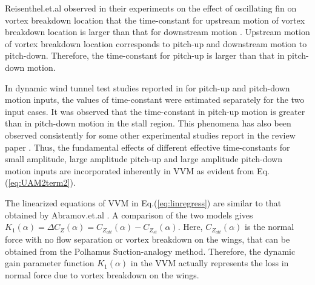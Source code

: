 \documentclass{AIAA}
\begin{document}
Reisenthel.et.al observed in their experiments on the effect of oscillating fin on vortex breakdown location that the time-constant for upstream motion of vortex breakdown location is larger than that for downstream motion \cite{ReiFin}. Upstream motion of vortex breakdown location corresponds to pitch-up and downstream motion to pitch-down. Therefore, the time-constant for pitch-up is larger than that in pitch-down motion.

In dynamic wind tunnel test studies reported in \cite{AGARDAR305} for pitch-up and pitch-down motion inputs, the values of time-constant were estimated separately for the two input cases. It was observed that the time-constant in pitch-up motion is greater than in pitch-down motion in the stall region. This phenomena has also been observed consistently for some other experimental studies report in the review paper \cite{Gursul}. Thus, the fundamental effects of different effective time-constants for small amplitude, large amplitude pitch-up and large amplitude pitch-down motion inputs are incorporated inherently in VVM as evident from Eq.(\ref{eq:UAM2term2}).

The linearized equations of VVM in Eq.(\ref{eq:linregress}) are similar to that obtained by Abramov.et.al \cite{Abramov1}. A comparison of the two models gives $K_1(\alpha)=\Delta C_Z(\alpha)= C_{Z_{att}}(\alpha)- C_{Z_{st}}(\alpha)$. Here, $C_{Z_{att}}(\alpha)$ is the normal force with no flow separation or vortex breakdown on the wings, that can be obtained from the Polhamus Suction-analogy method. Therefore, the dynamic gain parameter function $K_1(\alpha)$ in the VVM actually represents the loss in normal force due to vortex breakdown on the wings.

\end{document}
